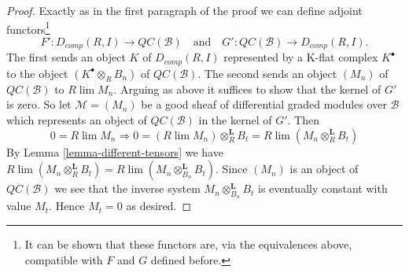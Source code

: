 \begin{proof}
\medskip\noindent
Exactly as in the first paragraph of the proof we can define
adjoint functors\footnote{It can be shown that these functors are,
via the equivalences above, compatible with $F$ and $G$ defined before.}
$$
F' : D_{comp}(R, I) \longrightarrow \mathit{QC}(\mathcal{B})
\quad\text{and}\quad
G' : \mathit{QC}(\mathcal{B}) \longrightarrow D_{comp}(R, I).
$$
The first sends an object $K$ of $D_{comp}(R, I)$ represented by a
K-flat complex $K^\bullet$ to the object $(K^\bullet \otimes_R B_n)$
of $\mathit{QC}(\mathcal{B})$. The second sends an object
$(M_n)$ of $\mathit{QC}(\mathcal{B})$ to $R\lim M_n$.
Arguing as above it suffices to show that the kernel of $G'$ is zero.
So let $\mathcal{M} = (M_n)$ be a good sheaf of differential graded
modules over $\mathcal{B}$ which represents an object of
$\mathit{QC}(\mathcal{B})$ in the kernel of $G'$. Then
$$
0 = R\lim M_n \Rightarrow
0 = (R\lim M_n) \otimes_R^\mathbf{L} B_t =
R\lim (M_n \otimes_R^\mathbf{L} B_t)
$$
By Lemma \ref{lemma-different-tensors} we have
$R\lim (M_n \otimes_R^\mathbf{L} B_t) =
R\lim (M_n \otimes_{B_n}^\mathbf{L} B_t)$.
Since $(M_n)$ is an object of $\mathit{QC}(\mathcal{B})$ we
see that the inverse system $M_n \otimes_{B_n}^\mathbf{L} B_t$
is eventually constant with value $M_t$. Hence $M_t = 0$ as desired.
\end{proof}
















